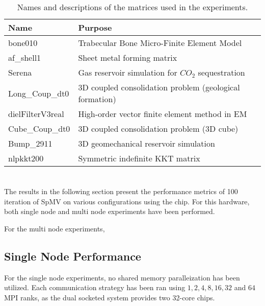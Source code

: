 \begin{table}[H]
\begin{center}
\begin{tabular}[c]{|p{3cm}|p{8.5cm}|}
\hline
\textbf{Name}&\textbf{Purpose}  \\
\hline
bone010&Trabecular Bone Micro-Finite Element Model\\
\hline
af\_shell1&Sheet metal forming matrix\\
\hline
Serena&Gas reservoir simulation for \(CO_{2}\) sequestration\\
\hline
Long\_Coup\_dt0&3D coupled consolidation problem (geological formation)\\
\hline
dielFilterV3real&High-order vector finite element method in EM\\
\hline
Cube\_Coup\_dt0&3D coupled consolidation problem (3D cube)\\
\hline
Bump\_2911&3D geomechanical reservoir simulation\\
\hline
nlpkkt200&Symmetric indefinite KKT matrix\\
\hline
\end{tabular}
\end{center}
\caption{Names and descriptions of the matrices used in the experiments.}
\label{tab:matricesused}
\end{table}

\section{}
The results in the following section present the performance metrics of 100 iteration of SpMV on various configurations using the  chip. For this hardware, both single node and multi node experiments have been performed.
\medskip


For the multi node experiments, 

\subsection{Single Node Performance}
\label{sec:singlenode}
For the single node experiments, no shared memory paralleization has been utilized. Each communication strategy has been ran using \(1,2,4,8,16,32\) and \(64\) MPI ranks, as the dual socketed system provides two 32-core  chips.
\medskip



